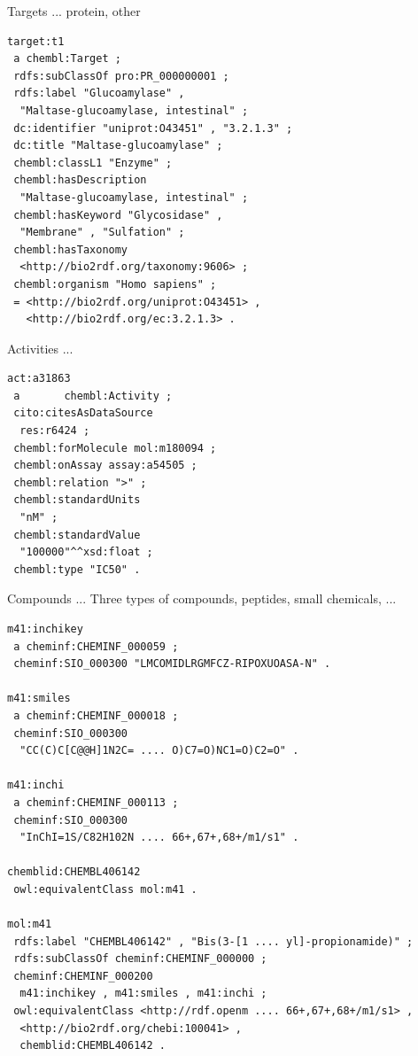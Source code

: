 \documentclass[sw]{iosart2c}
\begin{document}
Targets ... protein, other

\begin{small}
\begin{verbatim}
target:t1
 a chembl:Target ;
 rdfs:subClassOf pro:PR_000000001 ;
 rdfs:label "Glucoamylase" , 
  "Maltase-glucoamylase, intestinal" ;
 dc:identifier "uniprot:O43451" , "3.2.1.3" ;
 dc:title "Maltase-glucoamylase" ;
 chembl:classL1 "Enzyme" ;
 chembl:hasDescription
  "Maltase-glucoamylase, intestinal" ;
 chembl:hasKeyword "Glycosidase" , 
  "Membrane" , "Sulfation" ;
 chembl:hasTaxonomy
  <http://bio2rdf.org/taxonomy:9606> ;
 chembl:organism "Homo sapiens" ;
 = <http://bio2rdf.org/uniprot:O43451> , 
   <http://bio2rdf.org/ec:3.2.1.3> .
\end{verbatim}
\end{small}

Activities ...

\begin{small}
\begin{verbatim}
act:a31863
 a       chembl:Activity ;
 cito:citesAsDataSource
  res:r6424 ;
 chembl:forMolecule mol:m180094 ;
 chembl:onAssay assay:a54505 ;
 chembl:relation ">" ;
 chembl:standardUnits
  "nM" ;
 chembl:standardValue
  "100000"^^xsd:float ;
 chembl:type "IC50" .
\end{verbatim}
\end{small}

Compounds ... Three types of compounds, peptides, small chemicals, ...

\begin{tiny}
\begin{verbatim}
m41:inchikey
 a cheminf:CHEMINF_000059 ;
 cheminf:SIO_000300 "LMCOMIDLRGMFCZ-RIPOXUOASA-N" .

m41:smiles
 a cheminf:CHEMINF_000018 ;
 cheminf:SIO_000300
  "CC(C)C[C@@H]1N2C= .... O)C7=O)NC1=O)C2=O" .

m41:inchi
 a cheminf:CHEMINF_000113 ;
 cheminf:SIO_000300
  "InChI=1S/C82H102N .... 66+,67+,68+/m1/s1" .

chemblid:CHEMBL406142
 owl:equivalentClass mol:m41 .

mol:m41
 rdfs:label "CHEMBL406142" , "Bis(3-[1 .... yl]-propionamide)" ;
 rdfs:subClassOf cheminf:CHEMINF_000000 ;
 cheminf:CHEMINF_000200
  m41:inchikey , m41:smiles , m41:inchi ;
 owl:equivalentClass <http://rdf.openm .... 66+,67+,68+/m1/s1> ,
  <http://bio2rdf.org/chebi:100041> ,
  chemblid:CHEMBL406142 .
\end{verbatim}
\end{tiny}
\end{document}
